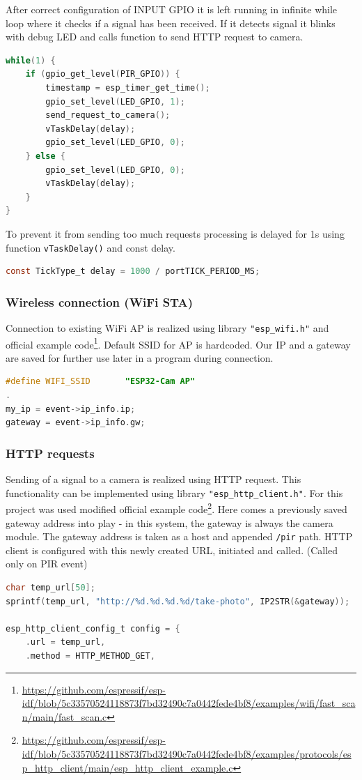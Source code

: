 \documentclass{article}
\begin{document}
    After correct configuration of INPUT GPIO it is left running
    in infinite while loop where it checks if a signal has been received.
    If it detects signal it blinks with debug LED and calls function
    to send HTTP request to camera.
    \begin{lstlisting}[language=C]
while(1) {  
    if (gpio_get_level(PIR_GPIO)) {
        timestamp = esp_timer_get_time();
        gpio_set_level(LED_GPIO, 1);
        send_request_to_camera();
        vTaskDelay(delay);
        gpio_set_level(LED_GPIO, 0);
    } else {
        gpio_set_level(LED_GPIO, 0);
        vTaskDelay(delay);
    }
}
    \end{lstlisting}
    
    To prevent it from sending too much requests processing is delayed
    for 1s using function \verb|vTaskDelay()| and const delay.
    \begin{lstlisting}[language=C]
const TickType_t delay = 1000 / portTICK_PERIOD_MS;
    \end{lstlisting}
    
    
    \subsubsection{Wireless connection (WiFi STA)}
    Connection to existing WiFi AP is realized using library \verb|"esp_wifi.h"|
    and official example code\footnote{\url{https://github.com/espressif/esp-idf/blob/5c33570524118873f7bd32490c7a0442fede4bf8/examples/wifi/fast_scan/main/fast_scan.c}}.
    Default SSID for AP is hardcoded. Our IP and a gateway are
    saved for further use later in a program during connection.
    \begin{lstlisting}[language=C]
#define WIFI_SSID       "ESP32-Cam AP"
.
my_ip = event->ip_info.ip;
gateway = event->ip_info.gw;
    \end{lstlisting}
    
    \subsubsection{HTTP requests}
    Sending of a signal to a camera is realized using HTTP request. This functionality
    can be implemented using library \verb|"esp_http_client.h"|. For this project was
    used modified official example code\footnote{\url{https://github.com/espressif/esp-idf/blob/5c33570524118873f7bd32490c7a0442fede4bf8/examples/protocols/esp_http_client/main/esp_http_client_example.c}}.
    Here comes a previously saved gateway address into play - in this system, the gateway is always
    the camera module. The gateway address is taken as a host and appended \verb|/pir| path.
    HTTP client is configured with this newly created URL, initiated and called. 
    (Called only on PIR event)
    \begin{lstlisting}[language=C]
char temp_url[50];
sprintf(temp_url, "http://%d.%d.%d.%d/take-photo", IP2STR(&gateway));
    
esp_http_client_config_t config = {
    .url = temp_url,
    .method = HTTP_METHOD_GET,
    \end{lstlisting}
\end{document}
